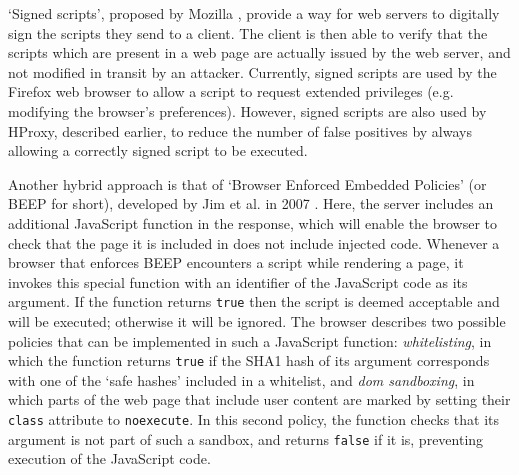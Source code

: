`Signed scripts', proposed by Mozilla \cite{SignedScripts}, provide a way for web servers to digitally sign the scripts they send to a client. The client is then able to verify that the scripts which are present in a web page are actually issued by the web server, and not modified in transit by an attacker. Currently, signed scripts are used by the Firefox web browser to allow a script to request extended privileges (e.g. modifying the browser's preferences). However, signed scripts are also used by HProxy, described earlier, to reduce the number of false positives by always allowing a correctly signed script to be executed.

Another hybrid approach is that of `Browser Enforced Embedded Policies' (or BEEP for short), developed by Jim et al. in 2007 \cite{Jim2007}. Here, the server includes an additional JavaScript function in the response, which will enable the browser to check that the page it is included in does not include injected code. Whenever a browser that enforces BEEP encounters a script while rendering a page, it invokes this special function with an identifier of the JavaScript code as its argument. If the function returns \texttt{true} then the script is deemed acceptable and will be executed; otherwise it will be ignored. The browser describes two possible policies that can be implemented in such a JavaScript function: \emph{whitelisting}, in which the function returns \texttt{true} if the SHA1 hash of its argument corresponds with one of the `safe hashes' included in a whitelist, and \emph{\gls{dom} sandboxing}, in which parts of the web page that include user content are marked by setting their \texttt{class} attribute to \texttt{noexecute}. In this second policy, the function checks that its argument is not part of such a sandbox, and returns \texttt{false} if it is, preventing execution of the JavaScript code.

